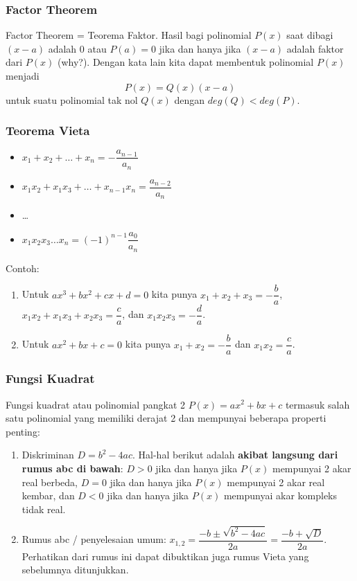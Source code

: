 \documentclass[11pt]{scrartcl}
\begin{document}
    \subsubsection{Factor Theorem}
    Factor Theorem = Teorema Faktor.
    Hasil bagi polinomial $P(x)$ saat dibagi $(x-a)$ adalah $0$ atau $P(a)=0$ jika dan hanya jika $(x-a)$ adalah faktor dari $P(x)$ (why?).
    Dengan kata lain kita dapat membentuk polinomial $P(x)$ menjadi
    $$P(x)=Q(x)(x-a)$$
    untuk suatu polinomial tak nol $Q(x)$ dengan $deg(Q)<deg(P)$.
    
    \subsubsection{Teorema Vieta}
    \begin{itemize}
        \item $x_1+x_2+\dots+x_n=-\dfrac{a_{n-1}}{a_n}$
        \item $x_1x_2+x_1x_3+\dots+x_{n-1}x_n=\dfrac{a_{n-2}}{a_n}$
        \item \dots
        \item $x_1x_2x_3\ldots x_n = (-1)^{n-1}\dfrac{a_{0}}{a_n}$
    \end{itemize}
    
    Contoh:
    \begin{enumerate}
    \item Untuk $ax^3+bx^2+cx+d=0$ kita punya $x_1+x_2+x_3=-\dfrac{b}{a}$, $x_1x_2+x_1x_3+x_2x_3=\dfrac{c}{a}$, dan $x_1x_2x_3=-\dfrac{d}{a}$.
    \item Untuk $ax^2+bx+c=0$ kita punya $x_1+x_2=-\dfrac{b}{a}$ dan $x_1x_2=\dfrac{c}{a}$.
    \end{enumerate}
    
    \subsubsection{Fungsi Kuadrat}
    Fungsi kuadrat atau polinomial pangkat 2 $P(x)=ax^2+bx+c$ termasuk salah satu polinomial yang memiliki derajat 2 dan mempunyai beberapa properti penting:
    \begin{enumerate}
    \item Diskriminan $D=b^2-4ac$. Hal-hal berikut adalah \textbf{akibat langsung dari rumus abc di bawah}: $D>0$ jika dan hanya jika $P(x)$ mempunyai 2 akar real berbeda,  $D=0$ jika dan hanya jika $P(x)$ mempunyai 2 akar real kembar, dan $D<0$ jika dan hanya jika $P(x)$ mempunyai akar kompleks tidak real.
    \item Rumus abc / penyelesaian umum: $x_{1,2} = \dfrac{-b \pm \sqrt{b^2-4ac}}{2a} = \dfrac{-b+\sqrt{D}}{2a}$. Perhatikan dari rumus ini dapat dibuktikan juga rumus Vieta yang sebelumnya ditunjukkan.
    \end{enumerate}
    
\end{document}
